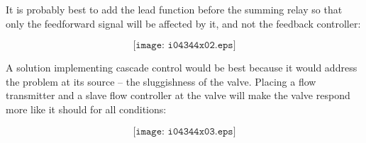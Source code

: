 \vskip 10pt

It is probably best to add the lead function before the summing relay so that only the feedforward signal will be affected by it, and not the feedback controller:

$$\texttt{[image: i04344x02.eps]}$$

\filbreak

A solution implementing cascade control would be best because it would address the problem at its source -- the sluggishness of the valve.  Placing a flow transmitter and a slave flow controller at the valve will make the valve respond more like it should for all conditions:

$$\texttt{[image: i04344x03.eps]}$$




